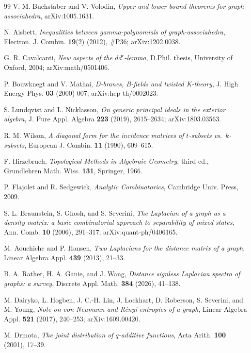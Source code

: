 \documentclass[11pt]{article}
\theoremstyle{definition}
\begin{document}
\begin{thebibliography}{99}
 V. M. Buchstaber and V. Volodin, \emph{Upper and lower bound theorems for graph-associahedra}, arXiv:1005.1631.

 N. Aisbett, \emph{Inequalities between gamma-polynomials of graph-associahedra}, Electron. J. Combin. \textbf{19}(2) (2012), \#P36; arXiv:1202.0038.

 G. R. Cavalcanti, \emph{New aspects of the $dd^c$-lemma}, D.Phil. thesis, University of Oxford, 2004; arXiv:math/0501406.

 P. Bouwknegt and V. Mathai, \emph{D-branes, B-fields and twisted K-theory}, J. High Energy Phys. \textbf{03} (2000) 007; arXiv:hep-th/0002023.

 S. Lundqvist and L. Nicklasson, \emph{On generic principal ideals in the exterior algebra}, J. Pure Appl. Algebra \textbf{223} (2019), 2615--2634; arXiv:1803.03563.

 R. M. Wilson, \emph{A diagonal form for the incidence matrices of $t$-subsets vs.\ $k$-subsets}, European J. Combin. \textbf{11} (1990), 609--615.

 F. Hirzebruch, \emph{Topological Methods in Algebraic Geometry}, third ed., Grundlehren Math. Wiss. \textbf{131}, Springer, 1966.

 P. Flajolet and R. Sedgewick, \emph{Analytic Combinatorics}, Cambridge Univ. Press, 2009.

 S. L. Braunstein, S. Ghosh, and S. Severini, \emph{The Laplacian of a graph as a density matrix: a basic combinatorial approach to separability of mixed states}, Ann. Comb. \textbf{10} (2006), 291--317; arXiv:quant-ph/0406165.

 M. Aouchiche and P. Hansen, \emph{Two Laplacians for the distance matrix of a graph}, Linear Algebra Appl. \textbf{439} (2013), 21--33.

 B. A. Rather, H. A. Ganie, and J. Wang, \emph{Distance signless Laplacian spectra of graphs: a survey}, Discrete Appl. Math. \textbf{384} (2026), 41--138.

 M. Dairyko, L. Hogben, J. C.-H. Lin, J. Lockhart, D. Roberson, S. Severini, and M. Young, \emph{Note on von Neumann and R\'enyi entropies of a graph}, Linear Algebra Appl. \textbf{521} (2017), 240--253; arXiv:1609.00420.

 M. Drmota, \emph{The joint distribution of $q$-additive functions}, Acta Arith. \textbf{100} (2001), 17--39.


\end{thebibliography}
\end{document}
